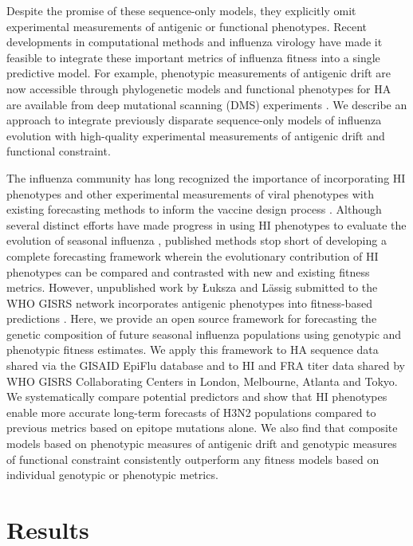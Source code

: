Despite the promise of these sequence-only models, they explicitly omit experimental measurements of antigenic or functional phenotypes.
Recent developments in computational methods and influenza virology have made it feasible to integrate these important metrics of influenza fitness into a single predictive model.
For example, phenotypic measurements of antigenic drift are now accessible through phylogenetic models \citep{Neher:2016hy} and functional phenotypes for HA are available from deep mutational scanning (DMS) experiments \citep{Lee2018}.
We describe an approach to integrate previously disparate sequence-only models of influenza evolution with high-quality experimental measurements of antigenic drift and functional constraint.

The influenza community has long recognized the importance of incorporating HI phenotypes and other experimental measurements of viral phenotypes with existing forecasting methods to inform the vaccine design process \citep{Gandon:2016gz,Morris:2017ea,Lassig:2017hr}.
Although several distinct efforts have made progress in using HI phenotypes to evaluate the evolution of seasonal influenza \citep{Steinbruck:2014kq,Neher:2016hy}, published methods stop short of developing a complete forecasting framework wherein the evolutionary contribution of HI phenotypes can be compared and contrasted with new and existing fitness metrics.
However, unpublished work by {\L}uksza and L\"assig submitted to the WHO GISRS network incorporates antigenic phenotypes into fitness-based predictions \citep{Morris:2017ea,luksza_personal_communication}.
Here, we provide an open source framework for forecasting the genetic composition of future seasonal influenza populations using genotypic and phenotypic fitness estimates.
We apply this framework to HA sequence data shared via the GISAID EpiFlu database \citep{shu2017gisaid} and to HI and FRA titer data shared by WHO GISRS Collaborating Centers in London, Melbourne, Atlanta and Tokyo.
We systematically compare potential predictors and show that HI phenotypes enable more accurate long-term forecasts of H3N2 populations compared to previous metrics based on epitope mutations alone.
We also find that composite models based on phenotypic measures of antigenic drift and genotypic measures of functional constraint consistently outperform any fitness models based on individual genotypic or phenotypic metrics.

\section*{Results}

